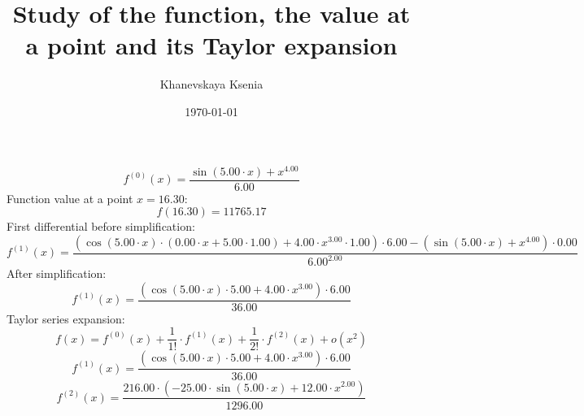 \documentclass[12pt, letterpaper]{article}
\title {Study of the function, the value at a point and its Taylor expansion}
\author{Khanevskaya Ksenia}
\date{\today}
\begin{document}
\maketitle
\[f^{(0)}(x)=\frac{\sin(5.00 \cdot x)+x^{4.00}}{6.00}\]
Function value at a point $x=16.30$: \[f(16.30)=11765.17\]
First differential before simplification:
\[f^{(1)}(x)=\frac{(\cos(5.00 \cdot x) \cdot (0.00 \cdot x+5.00 \cdot 1.00)+4.00 \cdot x^{3.00} \cdot 1.00) \cdot 6.00-(\sin(5.00 \cdot x)+x^{4.00}) \cdot 0.00}{6.00^{2.00}}\]
After simplification:
\[f^{(1)}(x)=\frac{(\cos(5.00 \cdot x) \cdot 5.00+4.00 \cdot x^{3.00}) \cdot 6.00}{36.00}\]
Taylor series expansion:
\[f(x)=f^{(0)}(x)+\frac{1}{1!} \cdot f^{(1)}(x)+\frac{1}{2!} \cdot f^{(2)}(x) + o(x^{2})\]
\[f^{(1)}(x)=\frac{(\cos(5.00 \cdot x) \cdot 5.00+4.00 \cdot x^{3.00}) \cdot 6.00}{36.00}\]
\[f^{(2)}(x)=\frac{216.00 \cdot (-25.00 \cdot \sin(5.00 \cdot x)+12.00 \cdot x^{2.00})}{1296.00}\]
\end{document}
